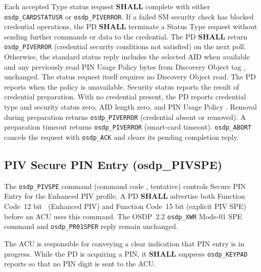 

Each accepted Type  status request \textbf{SHALL} complete with either
\texttt{osdp\_CARDSTATUSR} or \texttt{osdp\_PIVERROR}. If a failed SM security
check has blocked credential operations, the PD \textbf{SHALL} terminate a
Status Type  request without sending further commands or data to
the credential. The PD \textbf{SHALL} return \texttt{osdp\_PIVERROR}
 (credential security conditions not satisfied) on the next poll.
Otherwise, the standard status reply includes the
selected AID when available and any previously read PIN Usage Policy bytes
from Discovery Object tag , unchanged. The status request itself
requires no Discovery Object read. The PD reports  when the policy
is unavailable. Security status reports the result of credential preparation.
With no credential present, the PD reports credential type and security status zero,
AID length zero, and PIN
Usage Policy . Removal during preparation returns
\texttt{osdp\_PIVERROR}  (credential absent or removed). A preparation
timeout returns \texttt{osdp\_PIVERROR}  (smart-card timeout).
\texttt{osdp\_ABORT} cancels the request with \texttt{osdp\_ACK} and clears its
pending completion reply.



\subsection{PIV Secure PIN Entry (osdp\_PIVSPE)}

The \texttt{osdp\_PIVSPE} command (command code , tentative) controls
Secure PIN Entry for the Enhanced PIV profile. A PD \textbf{SHALL} advertise both
Function Code~12 bit~ (Enhanced PIV) and Function Code~15 bit
 (explicit PIV SPE) before an ACU uses this command. The OSDP~2.2
\texttt{osdp\_XWR} Mode-01 SPE command and \texttt{osdp\_PR01SPER} reply remain
unchanged.

The ACU is responsible for conveying a clear indication that PIN entry is in
progress. While the PD is acquiring a PIN, it \textbf{SHALL} suppress
\texttt{osdp\_KEYPAD} reports so that no PIN digit is sent to the ACU.







